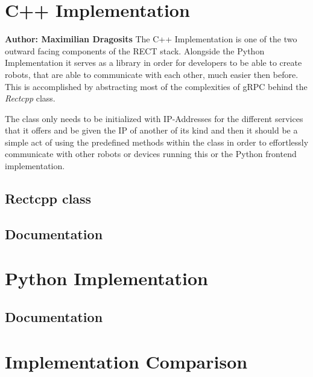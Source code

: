 \section{C++ Implementation}
\textbf{Author: Maximilian Dragosits}
The C++ Implementation is one of the two outward facing components of the RECT stack. Alongside the Python Implementation 
it serves as a library in order for developers to be able to create robots, that are able to communicate with each other, much
easier then before. This is accomplished by abstracting most of the complexities of gRPC behind the \textit{Rectcpp} class. 

The class only needs to be initialized with IP-Addresses for the different services that it offers and be given the IP of 
another of its kind and then it should be a simple act of using the predefined methods within the class in order to 
effortlessly communicate with other robots or devices running this or the Python frontend implementation.

\subsection{Rectcpp class}
\subsection{Documentation}

\section{Python Implementation}

\subsection{Documentation}

\section{Implementation Comparison}

\filbreak
